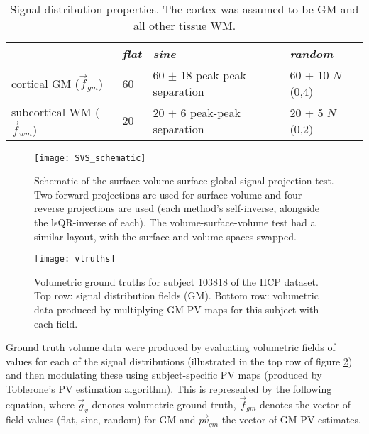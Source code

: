 \begin{table}[H]
\centering
\def\arraystretch{1.5}
\newcommand{\wrap}[1]{\parbox{\linewidth}{\vspace{1.5mm}#1\vspace{1mm}}}
\begin{tabular}{p{4cm}|p{1.5cm}p{5cm}p{3cm}}
& \textit{flat}  & \textit{sine} & \textit{random} \\ \hline
cortical GM ($\vec{f}_{gm}$) & 60 & \wrap{60 $\pm$ 18 \\ peak-peak separation } & 60 + 10 $N$(0,4) \\
subcortical WM ($\vec{f}_{wm}$) & 20 & \wrap{20 $\pm$ 6 \\ peak-peak separation } & 20 + 5 $N$(0,2) \\
\end{tabular}
\caption{Signal distribution properties. The cortex was assumed to be GM and all other tissue WM.}
\label{signaltable}
\end{table}


\begin{figure}[H]
\centering
\texttt{[image: SVS\_schematic]}
\caption{Schematic of the surface-volume-surface global signal projection test. Two forward projections are used for surface-volume and four reverse projections are used (each method's self-inverse, alongside the lsQR-inverse of each). The volume-surface-volume test had a similar layout, with the surface and volume spaces swapped.}
\label{SVS_schematic} 
\end{figure}

\begin{figure}[H]
\centering
\texttt{[image: vtruths]}
\caption{Volumetric ground truths for subject 103818 of the HCP dataset. Top row: signal distribution fields (GM). Bottom row: volumetric data produced by multiplying GM PV maps for this subject with each field.}
\label{vol_truth} 
\end{figure}

Ground truth volume data were produced by evaluating volumetric fields of values for each of the signal distributions (illustrated in the top row of figure \ref{vol_truth}) and then modulating these using subject-specific PV maps (produced by Toblerone's PV estimation algorithm). This is represented by the following equation, where $\vec{g}_v$ denotes volumetric ground truth, $\vec{f}_{gm}$ denotes the vector of field values (flat, sine, random) for GM and $\vec{pv}_{gm}$ the vector of GM PV estimates.

